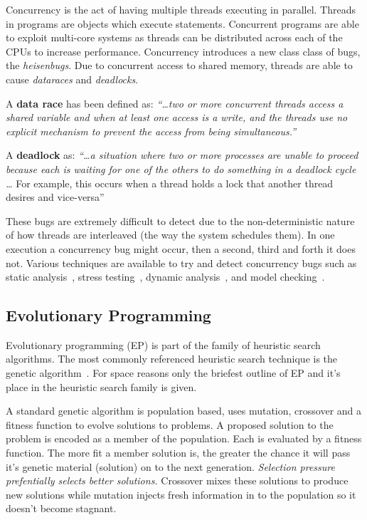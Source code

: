 \documentclass[10pt, conference, compsocconf]{IEEEtran}
\begin{document}
Concurrency is the act of having multiple threads executing in parallel.
Threads in programs are objects which execute statements. Concurrent programs 
are able to exploit multi-core systems as threads can be distributed across
each of the CPUs to increase performance. Concurrency introduces a new class
class of bugs, the \textit{heisenbugs}.  Due to concurrent access to shared 
memory, threads are able to cause \textit{dataraces} and \textit{deadlocks}.

A \textbf{data race} has been defined as: \textit{``\ldots two or more
concurrent threads access a shared variable and when at least one access is a
write, and the threads use no explicit mechanism to prevent the access from
being simultaneous.''}~\cite{LSW07}

A \textbf{deadlock} as: \textit{``\ldots a situation where two or more
processes are unable to proceed because each is waiting for one of the others
to do something in a deadlock cycle \ldots} For example, this occurs when a
thread holds a lock that another thread desires and vice-versa''~\cite{LSW07}

These bugs are extremely difficult to detect due to the non-deterministic
nature of how threads are interleaved (the way the system schedules them). In
one execution a concurrency bug might occur, then a second, third and forth it
does not. Various techniques are available to try and detect concurrency bugs
such as static analysis~\cite{NA07,NPSG09,HP04}, stress testing~\cite{HSU03},
dynamic analysis~\cite{JNPS09,EFN+02}, and model
checking~\cite{BHPV00,RDH03,OM03,MQB07,Holz97,JM04,HP00}.

\subsection{Evolutionary Programming}
\label{sec:evolutionary_programming}

Evolutionary programming (EP) is part of the family of heuristic search
algorithms. The most commonly referenced heuristic search technique is the
genetic algorithm~\cite{GA92}. For space reasons only the briefest outline of
EP and it's place in the heuristic search family is given.

A standard genetic algorithm is population based, uses mutation, crossover
and a fitness function to evolve solutions to problems. A proposed solution to
the problem is encoded as a member of the population. Each is evaluated by a
fitness function.   The more fit a member solution is, the greater the chance
it will pass it's genetic material (solution) on to the next generation.
\textit{Selection pressure prefentially selects better solutions.} Crossover
mixes these solutions to produce new solutions while mutation injects fresh
information in to the population so it doesn't become stagnant.
\end{document}
